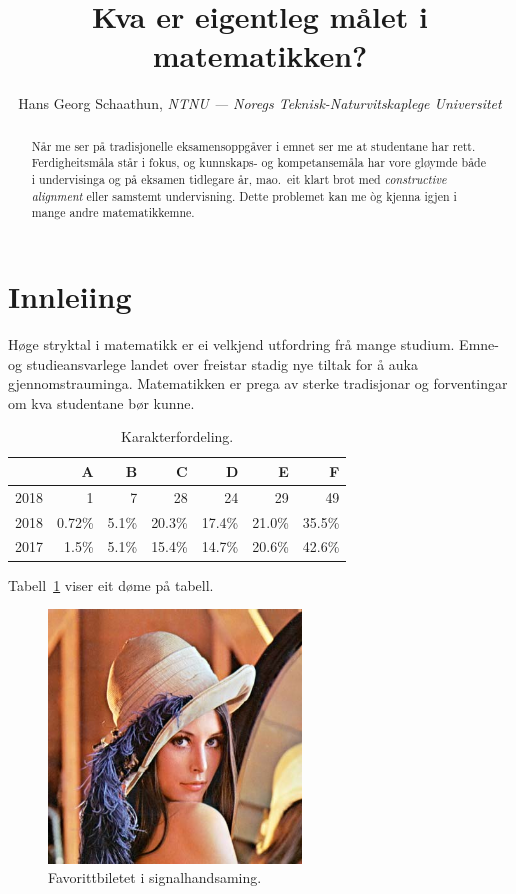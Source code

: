 \documentclass[nynorsk]{mnt}
\title{Kva er eigentleg målet i matematikken?}
\author{Hans Georg Schaathun,
\emph{NTNU --- Noregs Teknisk-Naturvitskaplege Universitet}}
\begin{document}
\maketitle

\begin{abstract}
   Når me ser på tradisjonelle eksamensoppgåver i emnet ser me at 
   studentane har rett. Ferdigheitsmåla står i fokus, og kunnskaps-
   og kompetansemåla har vore gløymde både i undervisinga og på
   eksamen tidlegare år, mao.\ eit klart brot med 
   \emph{constructive alignment} \citep{biggs11a} 
   eller samstemt undervisning.
   Dette problemet kan me òg kjenna igjen i mange andre matematikkemne.
\end{abstract}

\section{Innleiing}

Høge stryktal i matematikk er ei velkjend utfordring frå mange studium.
Emne- og studieansvarlege landet over freistar 
stadig nye tiltak for å auka gjennomstrauminga.
Matematikken er prega av sterke tradisjonar og forventingar om kva
studentane bør kunne.

\begin{table}
\centering
  \caption{Karakterfordeling.}
  \begin{tabular}{l|r|r|r|r|r|r|}
  & A & B & C & D & E & F \\
  \hline
  2018 & 1 & 7 & 28 & 24 & 29 & 49 \\
  \hline
  2018 &
  \num{0.72}\% &
  \num{5.1}\% &
  \num{20.3}\% &
  \num{17.4}\% &
  \num{21.0}\% &
  \num{35.5}\%  \\
  \hline
  2017 &
  \num{1.5}\% &
  \num{5.1}\% &
  \num{15.4}\% &
  \num{14.7}\% &
  \num{20.6}\% &
  \num{42.6}\% \\
  \hline
  \end{tabular}
  \label{tab:grade}
\end{table}


Tabell~\ref{tab:grade} viser eit døme på tabell.

\begin{figure}
\begin{center}
  \includegraphics[width=0.6\textwidth]{Lenna}
\end{center}
  \caption{Favorittbiletet i signalhandsaming.}
  \label{lenna}
\end{figure}
\end{document}
